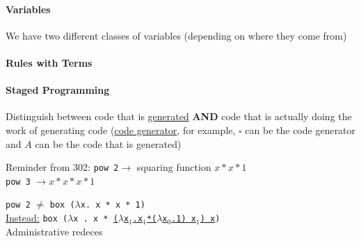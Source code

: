 \documentclass[12 pt]{article}
\begin{document}
       \paragraph{Variables}
       We have two different classes of variables (depending on where
       they come from)
       \begin{prooftree}
       \end{prooftree}
       \begin{prooftree}
       \end{prooftree}
       \paragraph{Rules with Terms}
       \begin{prooftree}
       \end{prooftree}
       \begin{prooftree}
       \end{prooftree}
       \paragraph{Staged Programming}
       Distinguish between code that is \underline{generated} \textbf{AND} code
       that is actually doing the work of generating code (\underline{code
         generator}, for example, $\square$ can be the code generator and
       $A$ can be the code that is generated)

       Reminder from 302: \texttt{pow 2}$\to $ squaring function $x * x * 1$
       \\ \texttt{pow 3} $\to x * x * x * 1$
       \begin{algorithmic}
         \Else
         \EndIf
       \end{algorithmic}
       \texttt{pow 2} $\neq$ \texttt{box ($\lambda$x. x * x * 1)}
       \\ \underline{Instead:} \texttt{box ($\lambda$x . x *
         \underline{($\lambda$x$_1$.x$_1$*($\lambda$x$_0$.1) x$_1$) x})}
       \\ Administrative redeces
\end{document}

